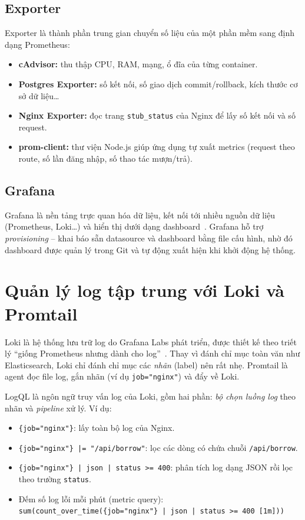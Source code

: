 \documentclass[../main.tex]{subfiles}
\begin{document}
\subsection{Exporter}
Exporter là thành phần trung gian chuyển số liệu của một phần mềm sang định dạng Prometheus:
\begin{itemize}
    \item \textbf{cAdvisor:} thu thập CPU, RAM, mạng, ổ đĩa của từng container.
    \item \textbf{Postgres Exporter:} số kết nối, số giao dịch commit/rollback, kích thước cơ sở dữ liệu\ldots
    \item \textbf{Nginx Exporter:} đọc trang \texttt{stub\_status} của Nginx để lấy số kết nối và số request.
    \item \textbf{prom-client:} thư viện Node.js giúp ứng dụng tự xuất metrics (request theo route, số lần đăng nhập, số thao tác mượn/trả).
\end{itemize}

\subsection{Grafana}
Grafana là nền tảng trực quan hóa dữ liệu, kết nối tới nhiều nguồn dữ liệu (Prometheus, Loki\ldots) và hiển thị dưới dạng dashboard~\cite{grafana-docs}. Grafana hỗ trợ \textit{provisioning} -- khai báo sẵn datasource và dashboard bằng file cấu hình, nhờ đó dashboard được quản lý trong Git và tự động xuất hiện khi khởi động hệ thống.

\section{Quản lý log tập trung với Loki và Promtail}
Loki là hệ thống lưu trữ log do Grafana Labs phát triển, được thiết kế theo triết lý ``giống Prometheus nhưng dành cho log''~\cite{loki-docs}. Thay vì đánh chỉ mục toàn văn như Elasticsearch, Loki chỉ đánh chỉ mục các \textit{nhãn} (label) nên rất nhẹ. Promtail là agent đọc file log, gắn nhãn (ví dụ \texttt{job="nginx"}) và đẩy về Loki.

LogQL là ngôn ngữ truy vấn log của Loki, gồm hai phần: \textit{bộ chọn luồng log} theo nhãn và \textit{pipeline} xử lý. Ví dụ:
\begin{itemize}
    \item \texttt{\{job="nginx"\}}: lấy toàn bộ log của Nginx.
    \item \texttt{\{job="nginx"\} |= "/api/borrow"}: lọc các dòng có chứa chuỗi \texttt{/api/borrow}.
    \item \texttt{\{job="nginx"\} | json | status >= 400}: phân tích log dạng JSON rồi lọc theo trường \texttt{status}.
    \item Đếm số log lỗi mỗi phút (metric query):\\ \texttt{sum(count\_over\_time(\{job="nginx"\} | json | status >= 400 [1m]))}
\end{itemize}
\end{document}
